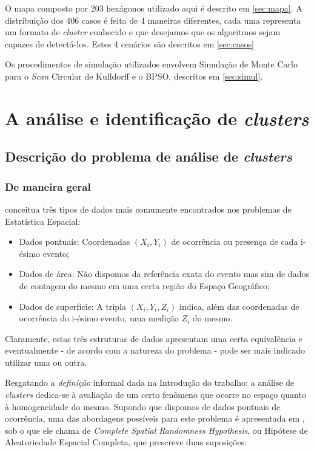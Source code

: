 \documentclass[
	12pt,				%
	openright,			%
	twoside,			%
	a4paper,			%
	english,			%
	french,				%
	spanish,			%
	brazil				%
	]{abntex2}
\begin{document}
O mapa composto por 203 hexágonos utilizado aqui é descrito em \ref{sec:mapa}. A distribuição dos 406 casos é feita de 4 maneiras diferentes, cada uma representa um formato de \textit{cluster} conhecido e que desejamos que os algoritmos sejam capazes de detectá-los. Estes 4 cenários são descritos em \ref{sec:casos}

Os procedimentos de simulação utilizados envolvem Simulação de Monte Carlo para o \textit{Scan} Circular de Kulldorff e o BPSO, descritos em \ref{sec:simul}. 

\part{A análise e identificação de \textit{clusters}}
\label{parte:1}

\chapter{Descrição do problema de análise de \textit{clusters}}
\label{chap:prob} 




\section{De maneira geral}
\label{sec:geral}

\cite{cressie2015statistics} conceitua três tipos de dados mais comumente encontrados nos problemas de Estatística Espacial:

\begin{itemize}
	\item Dados pontuais: Coordenadas $(X_i, Y_i)$ de ocorrência ou presença de cada i-ésimo evento; 
    \item Dados de área: Não dispomos da referência exata do evento mas sim de dados de contagem do mesmo em uma certa região do Espaço Geográfico;
    \item Dados de superfície: A tripla $(X_i, Y_i, Z_i)$ indica, além das coordenadas de ocorrência do i-ésimo evento, uma medição $Z_i$ do mesmo.
\end{itemize}

Claramente, estas três estruturas de dados apresentam uma certa equivalência e eventualmente - de acordo com a natureza do problema - pode ser mais indicado utilizar uma ou outra. 

Resgatando a \textit{definição} informal dada na Introdução do trabalho: a análise de \textit{clusters} dedica-se à avaliação de um certo fenômeno que ocorre no espaço quanto à homogeneidade do mesmo. Supondo que dispomos de dados pontuais de ocorrência, uma das abordagens possíveis para este problema é apresentada em \cite{diggle2013statistical}, sob o que ele chama de \textit{Complete Spatial Randomness Hypothesis}, ou Hipótese de Aleatoriedade Espacial Completa, que prescreve duas suposições:
\end{document}
